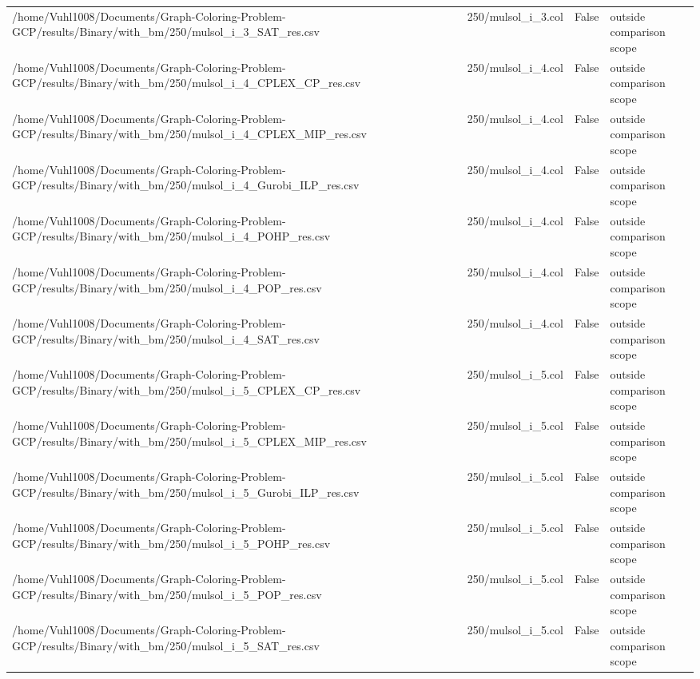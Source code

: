 \begin{table}[htbp]
\begin{tabular}{llll}
/home/Vuhl1008/Documents/Graph-Coloring-Problem-GCP/results/Binary/with\_bm/250/mulsol\_i\_3\_SAT\_res.csv & 250/mulsol\_i\_3.col & False & outside comparison scope \\
/home/Vuhl1008/Documents/Graph-Coloring-Problem-GCP/results/Binary/with\_bm/250/mulsol\_i\_4\_CPLEX\_CP\_res.csv & 250/mulsol\_i\_4.col & False & outside comparison scope \\
/home/Vuhl1008/Documents/Graph-Coloring-Problem-GCP/results/Binary/with\_bm/250/mulsol\_i\_4\_CPLEX\_MIP\_res.csv & 250/mulsol\_i\_4.col & False & outside comparison scope \\
/home/Vuhl1008/Documents/Graph-Coloring-Problem-GCP/results/Binary/with\_bm/250/mulsol\_i\_4\_Gurobi\_ILP\_res.csv & 250/mulsol\_i\_4.col & False & outside comparison scope \\
/home/Vuhl1008/Documents/Graph-Coloring-Problem-GCP/results/Binary/with\_bm/250/mulsol\_i\_4\_POHP\_res.csv & 250/mulsol\_i\_4.col & False & outside comparison scope \\
/home/Vuhl1008/Documents/Graph-Coloring-Problem-GCP/results/Binary/with\_bm/250/mulsol\_i\_4\_POP\_res.csv & 250/mulsol\_i\_4.col & False & outside comparison scope \\
/home/Vuhl1008/Documents/Graph-Coloring-Problem-GCP/results/Binary/with\_bm/250/mulsol\_i\_4\_SAT\_res.csv & 250/mulsol\_i\_4.col & False & outside comparison scope \\
/home/Vuhl1008/Documents/Graph-Coloring-Problem-GCP/results/Binary/with\_bm/250/mulsol\_i\_5\_CPLEX\_CP\_res.csv & 250/mulsol\_i\_5.col & False & outside comparison scope \\
/home/Vuhl1008/Documents/Graph-Coloring-Problem-GCP/results/Binary/with\_bm/250/mulsol\_i\_5\_CPLEX\_MIP\_res.csv & 250/mulsol\_i\_5.col & False & outside comparison scope \\
/home/Vuhl1008/Documents/Graph-Coloring-Problem-GCP/results/Binary/with\_bm/250/mulsol\_i\_5\_Gurobi\_ILP\_res.csv & 250/mulsol\_i\_5.col & False & outside comparison scope \\
/home/Vuhl1008/Documents/Graph-Coloring-Problem-GCP/results/Binary/with\_bm/250/mulsol\_i\_5\_POHP\_res.csv & 250/mulsol\_i\_5.col & False & outside comparison scope \\
/home/Vuhl1008/Documents/Graph-Coloring-Problem-GCP/results/Binary/with\_bm/250/mulsol\_i\_5\_POP\_res.csv & 250/mulsol\_i\_5.col & False & outside comparison scope \\
/home/Vuhl1008/Documents/Graph-Coloring-Problem-GCP/results/Binary/with\_bm/250/mulsol\_i\_5\_SAT\_res.csv & 250/mulsol\_i\_5.col & False & outside comparison scope \\

\end{tabular}
\end{table}
